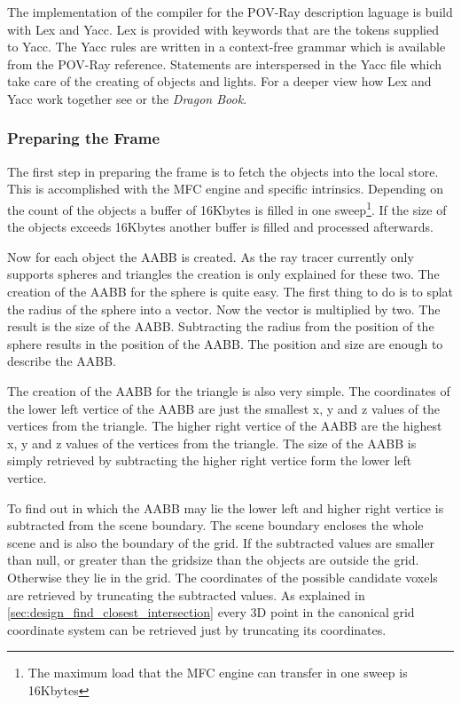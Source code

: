 \documentclass[DIV10, abstracton, openright, footsepline, headsepline, twoside, 9pt,
bigheadings]{scrreprt}
\begin{document}
The implementation of the compiler for the POV-Ray description laguage is build with
Lex and Yacc. Lex is provided with keywords that are the tokens supplied to Yacc.
The Yacc rules are written in a context-free grammar which is available from the
POV-Ray reference. Statements are interspersed in the Yacc file which take care
of the creating of objects and lights. For a deeper view how Lex and Yacc work
together see \cite{tldp06} or the \textit{Dragon Book}.

\subsubsection{Preparing the Frame}
\label{sec:impl_preparing_the_frame}
The first step in preparing the frame is to fetch the objects into the local store. This
is accomplished with the MFC engine and specific intrinsics. Depending on the count
of the objects a buffer of 16Kbytes is filled in one sweep\footnote{The maximum load that
 the MFC engine can transfer in one sweep is 16Kbytes}. If the size of the objects
exceeds 16Kbytes another buffer is filled and processed afterwards.

Now for each object the AABB is created. As the ray tracer currently only supports
spheres and triangles the creation is only explained for these two.
The creation of the AABB for the sphere is quite easy. The first thing to do is to
splat the radius of the sphere into a vector. Now the vector is multiplied by two. The
result is the size of the AABB. Subtracting the radius from the position of the sphere
results in the position of the AABB. The position and size are enough to describe the
AABB.

The creation of the AABB for the triangle is also very simple. The coordinates of the
lower left vertice of the AABB are just the smallest x, y and z values of the vertices
from the triangle. The higher right vertice of the AABB are the highest x, y and z values
of the vertices from the triangle. The size of the AABB is simply retrieved by subtracting
the higher right vertice form the lower left vertice.


To find out in which the AABB may lie the lower left and higher right vertice is subtracted
from the scene boundary. The scene boundary encloses the whole scene and is also
the boundary of the grid. If the subtracted values are smaller than null, or greater
than the gridsize than the objects are outside the grid. Otherwise they lie in the grid.
The coordinates of the possible candidate voxels are retrieved by truncating the subtracted
values. As explained in \ref{sec:design_find_closest_intersection} every 3D point in the
canonical grid coordinate system can be retrieved just by truncating its coordinates.
\end{document}

